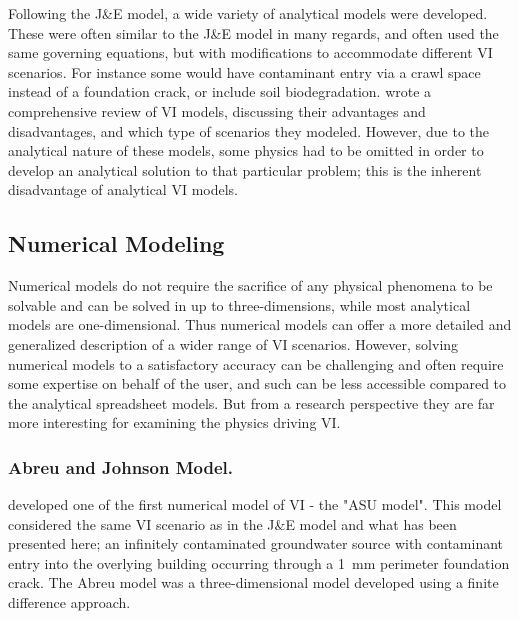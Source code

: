 Following the J\&E model, a wide variety of analytical models were developed.
These were often similar to the J\&E model in many regards, and often used the same governing equations, but with modifications to accommodate different VI scenarios.
For instance some would have contaminant entry via a crawl space instead of a foundation crack\cite{r._human_1994}, or include soil biodegradation\cite{anderssen_modelling_1997,hers_evaluation_2000}.
\citeauthor{yao_review_2013}\cite{yao_review_2013} wrote a comprehensive review of VI models, discussing their advantages and disadvantages, and which type of scenarios they modeled.
However, due to the analytical nature of these models, some physics had to be omitted in order to develop an analytical solution to that particular problem; this is the inherent disadvantage of analytical VI models.\par

\subsection{Numerical Modeling}

Numerical models do not require the sacrifice of any physical phenomena to be solvable and can be solved in up to three-dimensions, while most analytical models are one-dimensional.
Thus numerical models can offer a more detailed and generalized description of a wider range of VI scenarios.
However, solving numerical models to a satisfactory accuracy can be challenging and often require some expertise on behalf of the user, and such can be less accessible compared to  the analytical spreadsheet models.
But from a research perspective they are far more interesting for examining the physics driving VI.\par

\subsubsection{Abreu and Johnson Model.}

\citeauthor{abreu_effect_2005}\cite{abreu_effect_2005} developed one of the first numerical model of VI - the "ASU model".
This model considered the same VI scenario as in the J\&E model and what has been presented here; an infinitely contaminated groundwater source with contaminant entry into the overlying building occurring through a \SI{1}{\milli\metre} perimeter foundation crack.
The Abreu model was a three-dimensional model developed using a finite difference approach.\par


